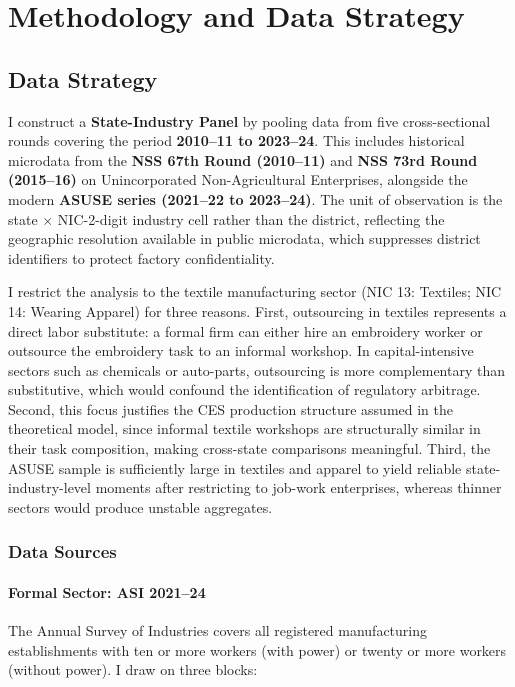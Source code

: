 \chapter{Methodology and Data Strategy}\label{chap:method&data}

\section{Data Strategy}
\label{sec:data}

I construct a \textbf{State-Industry Panel} by pooling data from five cross-sectional rounds covering the period \textbf{2010--11 to 2023--24}. This includes historical microdata from the \textbf{NSS 67th Round (2010--11)} and \textbf{NSS 73rd Round (2015--16)} on Unincorporated Non-Agricultural Enterprises, alongside the modern \textbf{ASUSE series (2021--22 to 2023--24)}. The unit of observation is the state $\times$ NIC-2-digit industry cell rather than the district, reflecting the geographic resolution available in public microdata, which suppresses district identifiers to protect factory confidentiality.

I restrict the analysis to the textile manufacturing sector (NIC 13: Textiles; NIC 14: Wearing Apparel) for three reasons. First, outsourcing in textiles represents a direct labor substitute: a formal firm can either hire an embroidery worker or outsource the embroidery task to an informal workshop. In capital-intensive sectors such as chemicals or auto-parts, outsourcing is more complementary than substitutive, which would confound the identification of regulatory arbitrage. Second, this focus justifies the CES production structure assumed in the theoretical model, since informal textile workshops are structurally similar in their task composition, making cross-state comparisons meaningful. Third, the ASUSE sample is sufficiently large in textiles and apparel to yield reliable state-industry-level moments after restricting to job-work enterprises, whereas thinner sectors would produce unstable aggregates.

\subsection{Data Sources}

\subsubsection{Formal Sector: ASI 2021--24}

The Annual Survey of Industries covers all registered manufacturing establishments with ten or more workers (with power) or twenty or more workers (without power). I draw on three blocks:

